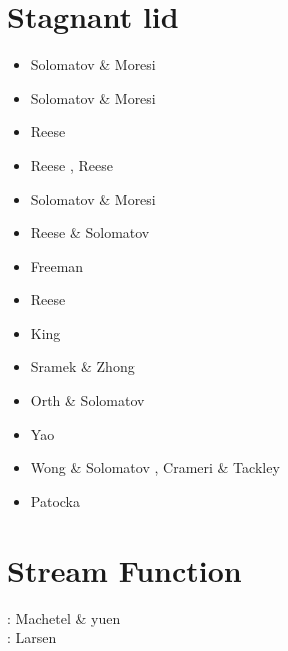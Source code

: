 \section{Stagnant lid} 

\begin{scriptsize}
\begin{itemize}
\item[\nineteenninetysix] Solomatov \& Moresi \cite{somo96}
\item[\nineteenninetyseven] Solomatov \& Moresi \cite{somo97}
\item[\nineteenninetyeight] Reese \etal \cite{resm98}
\item[\nineteenninetynine] Reese \etal \cite{resm99}, Reese \etal \cite{resb99}
\item[\twothousand] Solomatov \& Moresi \cite{somo00}
\item[\twothousandtwo] Reese \& Solomatov \cite{reso02}
\item[\twothousandfour] Freeman \etal \cite{frmm04}
\item[\twothousandfive] Reese \etal \cite{resb05}
\item[\twothousandnine] King \cite{king09}
\item[\twothousandten] Sramek \& Zhong \cite{srzh10}
\item[\twothousandeleven] Orth \& Solomatov \cite{orso11}
\item[\twothousandfourteen] Yao \etal \cite{yadl14}
\item[\twothousandsixteen] Wong \& Solomatov \cite{woso16b}, Crameri \& Tackley \cite{crta16}
\item[\twothousandseventeen] Patocka \etal \cite{pact17}
\end{itemize}
\end{scriptsize}

\section{Stream Function} 

\begin{scriptsize}
\noindent
\nineteeneightynine: Machetel \& yuen \cite{mayu89} \\
\nineteenninetysix: Larsen \etal \cite{laym96} \\
\end{scriptsize}

